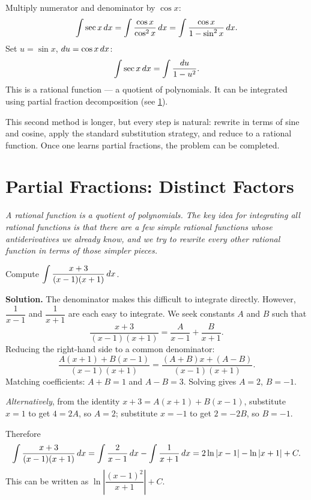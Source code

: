 Multiply numerator and denominator by $\cos x$:
\[
  \int \sec x\,dx = \int \frac{\cos x}{\cos^{2}x}\,dx = \int \frac{\cos x}{1 - \sin^{2}x}\,dx.
\]
Set $u = \sin x$, $du = \cos x\,dx$:
\[
  \int \sec x\,dx = \int \frac{du}{1 - u^{2}}.
\]
This is a rational function --- a quotient of polynomials.  It can be integrated using partial fraction decomposition (see \cref{sec:9.10}).

\begin{remark}
This second method is longer, but every step is natural: rewrite in terms of sine and cosine, apply the standard substitution strategy, and reduce to a rational function.  Once one learns partial fractions, the problem can be completed.
\end{remark}

\section{Partial Fractions: Distinct Factors}
\label{sec:9.10}

\textit{A rational function is a quotient of polynomials.  The key idea for integrating all rational functions is that there are a few simple rational functions whose antiderivatives we already know, and we try to rewrite every other rational function in terms of those simpler pieces.}

\begin{example}
\label{ex:9-17}
Compute $\displaystyle\int \frac{x+3}{(x-1)(x+1)}\,dx$.

\textbf{Solution.}  The denominator makes this difficult to integrate directly.  However, $\dfrac{1}{x-1}$ and $\dfrac{1}{x+1}$ are each easy to integrate.  We seek constants $A$ and $B$ such that
\[
  \frac{x+3}{(x-1)(x+1)} = \frac{A}{x-1} + \frac{B}{x+1}.
\]
Reducing the right-hand side to a common denominator:
\[
  \frac{A(x+1) + B(x-1)}{(x-1)(x+1)} = \frac{(A+B)x + (A-B)}{(x-1)(x+1)}.
\]
Matching coefficients: $A + B = 1$ and $A - B = 3$.  Solving gives $A = 2$, $B = -1$.

\textit{Alternatively}, from the identity $x + 3 = A(x+1) + B(x-1)$, substitute $x = 1$ to get $4 = 2A$, so $A = 2$; substitute $x = -1$ to get $2 = -2B$, so $B = -1$.

Therefore
\[
  \int \frac{x+3}{(x-1)(x+1)}\,dx = \int \frac{2}{x-1}\,dx - \int \frac{1}{x+1}\,dx = 2\ln\left\lvert x-1 \right\rvert - \ln\left\lvert x+1 \right\rvert + C.
\]
This can be written as $\ln\!\left|\dfrac{(x-1)^{2}}{x+1}\right| + C$.
\end{example}

